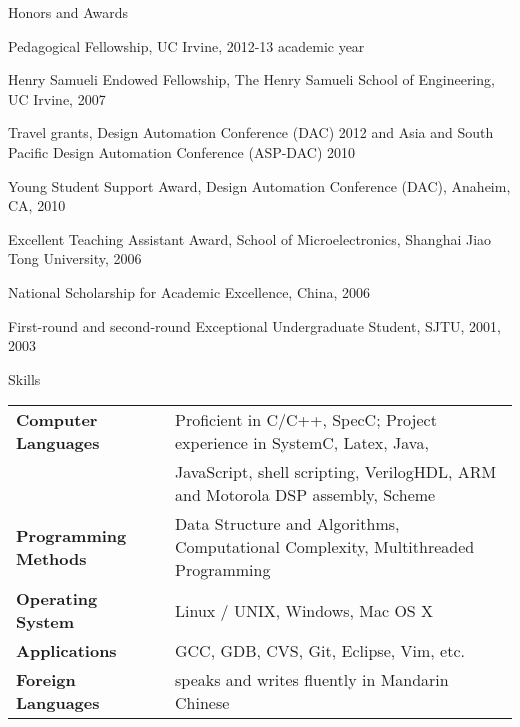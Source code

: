\documentclass{resume} %
\begin{document}
\newpage
\begin{rSection}{Honors and Awards}
\begin{itemize}
{\small
\item Pedagogical Fellowship, UC Irvine, 2012-13 academic year
\vspace{-0.5em}

\item Henry Samueli Endowed Fellowship, The Henry Samueli School of Engineering, UC Irvine, 2007
\vspace{-0.5em}

\item Travel grants, Design Automation Conference (DAC) 2012 and Asia and South Pacific Design Automation Conference (ASP-DAC) 2010
\vspace{-0.5em}

\item Young Student Support Award, Design Automation Conference (DAC), Anaheim, CA, 2010
\vspace{-0.5em}

\item Excellent Teaching Assistant Award, School of Microelectronics, Shanghai Jiao Tong University, 2006
\vspace{-0.5em}

\item  National Scholarship for Academic Excellence, China, 2006
\vspace{-0.5em}

\item First-round and second-round Exceptional Undergraduate Student, SJTU, 2001, 2003
}
\end{itemize}
\end{rSection}




\begin{rSection}{Skills}
{\small
\begin{tabular}{ @{} >{\bfseries}l @{\hspace{6ex}} l }

Computer Languages 	& 	Proficient in C/C++, SpecC; Project experience in SystemC, Latex, Java, \\
					&	JavaScript, shell scripting, VerilogHDL, ARM and Motorola DSP assembly, Scheme \\
Programming Methods	& 	Data Structure and Algorithms, Computational Complexity, Multithreaded Programming \\
Operating System		&	Linux / UNIX, Windows, Mac OS X   \\
Applications			&	GCC, GDB, CVS, Git, Eclipse, Vim, etc. \\
Foreign Languages		&	speaks and writes fluently in Mandarin Chinese
\end{tabular}
}
\end{rSection}
\end{document}
